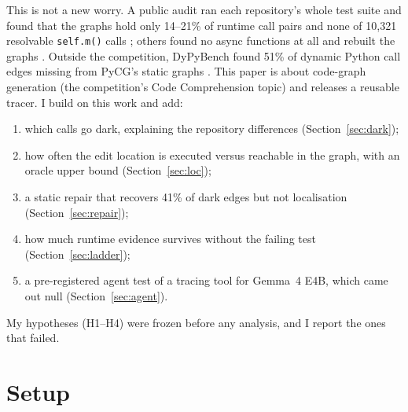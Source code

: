 \documentclass[11pt]{article}
\begin{document}
This is not a new worry. A public audit ran each repository's whole test suite and found that the graphs hold only 14--21\% of runtime call pairs and none of 10{,}321 resolvable \texttt{self.m()} calls \citep{akhil2026audit}; others found no async functions at all \citep{aghasalim,forum745998} and rebuilt the graphs \citep{mindthemap,codegraphloc}. Outside the competition, DyPyBench found 51\% of dynamic Python call edges missing from PyCG's static graphs \citep{bouzenia2024dypybench}. This paper is about code-graph generation (the competition's Code Comprehension topic) and releases a reusable tracer. I build on this work and add:
\begin{enumerate}\setlength\itemsep{0.1em}
\item which calls go dark, explaining the repository differences (Section~\ref{sec:dark});
\item how often the edit location is executed versus reachable in the graph, with an oracle upper bound (Section~\ref{sec:loc});
\item a static repair that recovers 41\% of dark edges but not localisation (Section~\ref{sec:repair});
\item how much runtime evidence survives without the failing test (Section~\ref{sec:ladder});
\item a pre-registered agent test of a tracing tool for Gemma~4 E4B, which came out null (Section~\ref{sec:agent}).
\end{enumerate}
My hypotheses (H1--H4) were frozen before any analysis, and I report the ones that failed.

\section{Setup}\label{sec:setup}
\end{document}
